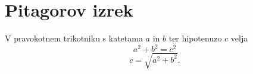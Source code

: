 \documentclass{article}
\begin{document}
\section*{Pitagorov izrek}
V pravokotnem trikotniku s katetama \(a\) in \(b\) ter hipotenuzo \(c\) velja
\[ a^2 + b^2 = c^2 \]
\[ c= \sqrt{a^2 + b^2}.\]
\end{document}
